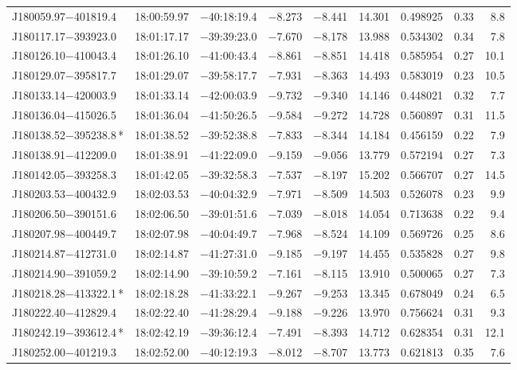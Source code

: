 \begin{table*}[ht!]
\begin{tabular}{lcccccccr}
J180059.97$-$401819.4 & 18:00:59.97 & $-$40:18:19.4 & $-$8.273 & $-$8.441 & 14.301 & 0.498925 & 0.33 & 8.8 \\
J180117.17$-$393923.0 & 18:01:17.17 & $-$39:39:23.0 & $-$7.670 & $-$8.178 & 13.988 & 0.534302 & 0.34 & 7.8 \\
J180126.10$-$410043.4 & 18:01:26.10 & $-$41:00:43.4 & $-$8.861 & $-$8.851 & 14.418 & 0.585954 & 0.27 & 10.1 \\
J180129.07$-$395817.7 & 18:01:29.07 & $-$39:58:17.7 & $-$7.931 & $-$8.363 & 14.493 & 0.583019 & 0.23 & 10.5 \\
J180133.14$-$420003.9 & 18:01:33.14 & $-$42:00:03.9 & $-$9.732 & $-$9.340 & 14.146 & 0.448021 & 0.32 & 7.7 \\
J180136.04$-$415026.5 & 18:01:36.04 & $-$41:50:26.5 & $-$9.584 & $-$9.272 & 14.728 & 0.560897 & 0.31 & 11.5 \\
J180138.52$-$395238.8\,* & 18:01:38.52 & $-$39:52:38.8 & $-$7.833 & $-$8.344 & 14.184 & 0.456159 & 0.22 &  7.9 \\
J180138.91$-$412209.0 & 18:01:38.91 & $-$41:22:09.0 & $-$9.159 & $-$9.056 & 13.779 & 0.572194 & 0.27 &  7.3 \\
J180142.05$-$393258.3 & 18:01:42.05 & $-$39:32:58.3 & $-$7.537 & $-$8.197 & 15.202 & 0.566707 & 0.27 & 14.5 \\
J180203.53$-$400432.9 & 18:02:03.53 & $-$40:04:32.9 & $-$7.971 & $-$8.509 & 14.503 & 0.526078 & 0.23 &  9.9 \\
J180206.50$-$390151.6 & 18:02:06.50 & $-$39:01:51.6 & $-$7.039 & $-$8.018 & 14.054 & 0.713638 & 0.22 &  9.4 \\
J180207.98$-$400449.7 & 18:02:07.98 & $-$40:04:49.7 & $-$7.968 & $-$8.524 & 14.109 & 0.569726 & 0.25 &  8.6 \\
J180214.87$-$412731.0 & 18:02:14.87 & $-$41:27:31.0 & $-$9.185 & $-$9.197 & 14.455 & 0.535828 & 0.27 &  9.8 \\
J180214.90$-$391059.2 & 18:02:14.90 & $-$39:10:59.2 & $-$7.161 & $-$8.115 & 13.910 & 0.500065 & 0.27 &  7.3 \\
J180218.28$-$413322.1\,* & 18:02:18.28 & $-$41:33:22.1 & $-$9.267 & $-$9.253 & 13.345 & 0.678049 & 0.24 &  6.5 \\
J180222.40$-$412829.4 & 18:02:22.40 & $-$41:28:29.4 & $-$9.188 & $-$9.226 & 13.970 & 0.756624 & 0.31 &  9.3 \\
J180242.19$-$393612.4\,* & 18:02:42.19 & $-$39:36:12.4 & $-$7.491 & $-$8.393 & 14.712 & 0.628354 & 0.31 & 12.1 \\
J180252.00$-$401219.3 & 18:02:52.00 & $-$40:12:19.3 & $-$8.012 & $-$8.707 & 13.773 & 0.621813 & 0.35 &  7.6 \\

\end{tabular}
\end{table*}
